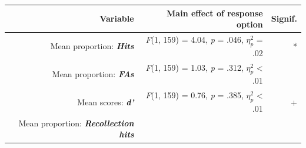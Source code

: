 \documentclass[
  11pt,
]{article}
\begin{document}
\begin{longtable}[]{@{}rrr@{}}
\toprule
\begin{minipage}[b]{0.38\columnwidth}\raggedleft
Variable\strut
\end{minipage} & \begin{minipage}[b]{0.46\columnwidth}\raggedleft
Main effect of response option\strut
\end{minipage} & \begin{minipage}[b]{0.07\columnwidth}\raggedleft
Signif.\strut
\end{minipage}\tabularnewline
\midrule
\endhead
\begin{minipage}[t]{0.38\columnwidth}\raggedleft
Mean proportion: \textbf{\emph{Hits}}\strut
\end{minipage} & \begin{minipage}[t]{0.46\columnwidth}\raggedleft
\emph{F}(1, 159) = 4.04, \emph{p} = .046, \(\eta^2_p\) = .02\strut
\end{minipage} & \begin{minipage}[t]{0.07\columnwidth}\raggedleft
*\strut
\end{minipage}\tabularnewline
\begin{minipage}[t]{0.38\columnwidth}\raggedleft
Mean proportion: \textbf{\emph{FAs}}\strut
\end{minipage} & \begin{minipage}[t]{0.46\columnwidth}\raggedleft
\emph{F}(1, 159) = 1.03, \emph{p} = .312, \(\eta^2_p\) \textless{}
.01\strut
\end{minipage} & \begin{minipage}[t]{0.07\columnwidth}\raggedleft
\strut
\end{minipage}\tabularnewline
\begin{minipage}[t]{0.38\columnwidth}\raggedleft
Mean scores: \textbf{\emph{d'}}\strut
\end{minipage} & \begin{minipage}[t]{0.46\columnwidth}\raggedleft
\emph{F}(1, 159) = 0.76, \emph{p} = .385, \(\eta^2_p\) \textless{}
.01\strut
\end{minipage} & \begin{minipage}[t]{0.07\columnwidth}\raggedleft
+\strut
\end{minipage}\tabularnewline
\begin{minipage}[t]{0.38\columnwidth}\raggedleft
Mean proportion: \textbf{\emph{Recollection hits}}\strut
\end{minipage} & \begin{minipage}[t]{0.46\columnwidth}\raggedleft

\end{minipage}
\end{longtable}
\end{document}
